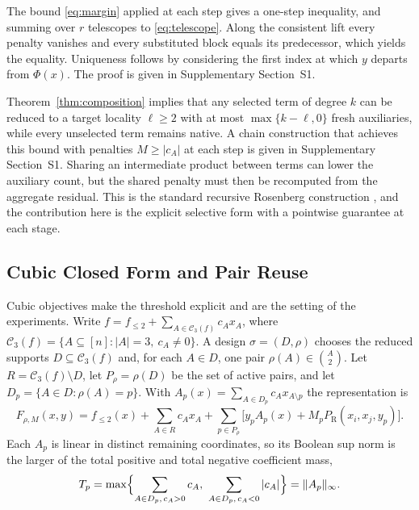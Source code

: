 \documentclass{ieeeaccess}
\newcommand{\PR}{P_{\mathrm{R}}}
\newcommand{\norminf}[1]{\lVert #1 \rVert_{\infty}}
\begin{document}
The bound \eqref{eq:margin} applied at each step gives a one-step inequality, and summing
over $r$ telescopes to \eqref{eq:telescope}. Along the consistent lift every penalty
vanishes and every substituted block equals its predecessor, which yields the equality.
Uniqueness follows by considering the first index at which $y$ departs from $\Phi(x)$.
The proof is given in Supplementary Section~S1.

Theorem~\ref{thm:composition} implies that any selected term of degree $k$ can be reduced
to a target locality $\ell\ge 2$ with at most $\max\{k-\ell,0\}$ fresh auxiliaries, while
every unselected term remains native. A chain construction that achieves this bound with
penalties $M\ge|c_A|$ at each step is given in Supplementary Section~S1. Sharing an
intermediate product between terms can lower the auxiliary count, but the shared penalty
must then be recomputed from the aggregate residual. This is the standard recursive
Rosenberg construction \cite{Rosenberg1975,BorosGruber2014}, and the contribution here is
the explicit selective form with a pointwise guarantee at each stage.

\subsection{Cubic Closed Form and Pair Reuse}
\label{sec:reduction:cubic}

Cubic objectives make the threshold explicit and are the setting of the experiments.
Write $f=f_{\le 2}+\sum_{A\in\mathcal{C}_3(f)}c_Ax_A$, where
$\mathcal{C}_3(f)=\{A\subseteq[n] : |A|=3,\ c_A\neq 0\}$. A design $\sigma=(D,\rho)$
chooses the reduced supports $D\subseteq\mathcal{C}_3(f)$ and, for each $A\in D$, one pair
$\rho(A)\in\binom{A}{2}$. Let $R=\mathcal{C}_3(f)\setminus D$, let $P_\rho=\rho(D)$ be the
set of active pairs, and let $D_p=\{A\in D : \rho(A)=p\}$. With
$A_p(x)=\sum_{A\in D_p}c_Ax_{A\setminus p}$ the representation is
\begin{equation}
F_{\rho,M}(x,y)=f_{\le 2}(x)+\!\sum_{A\in R}c_Ax_A
+\!\sum_{p\in P_\rho}\!\bigl[y_pA_p(x)+M_p\PR(x_i,x_j,y_p)\bigr].
\label{eq:cubic_rep}
\end{equation}
Each $A_p$ is linear in distinct remaining coordinates, so its Boolean sup norm is the
larger of the total positive and total negative coefficient mass,
\begin{equation}
T_p=\max\Bigl\{\sum_{A\in D_p,\,c_A>0}c_A,\ \sum_{A\in D_p,\,c_A<0}|c_A|\Bigr\}=\norminf{A_p}.
\label{eq:cubic_threshold}
\end{equation}
\end{document}
